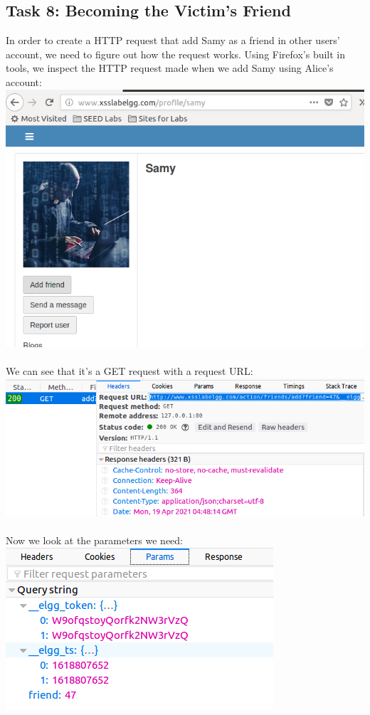 \documentclass[a4paper]{article}
\begin{document}
\subsection{Task 8: Becoming the Victim’s Friend}
In order to create a HTTP request that add Samy as a friend in other users' account, we need to figure out how the request works. Using Firefox's built in tools, we inspect the HTTP request made when we add Samy using Alice's account:\\
\includegraphics[scale=0.7]{2/11.png}\\\\
We can see that it's a GET request with a request URL:\\
\pagebreak
\includegraphics[scale=0.7]{2/12.png}\\\\
Now we look at the parameters we need:\\
\includegraphics[scale=0.7]{2/13.png}\\\\
\end{document}
